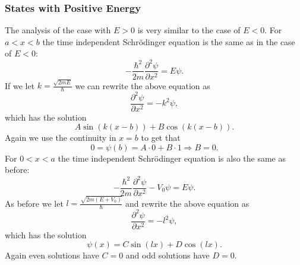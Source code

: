 \documentclass[12pt,a4paper]{article}
\newcommand{\pdiffn}[3]{\frac{\partial^{#3} #1}{\partial #2^{#3}}}
\begin{document}
\subsubsection{States with Positive Energy}
The analysis of the case with $E > 0$ is very similar to the case of $E < 0$. For $a < x < b$ the time independent Schrödinger equation is the same as in the case of $E < 0$:
\begin{equation}
- \frac{\hbar^2}{2 m} \pdiffn{\psi}{x}{2} = E \psi.
\end{equation}
If we let $k = \frac{\sqrt{2 m E}}{\hbar}$ we can rewrite the above equation as
\begin{equation}
\pdiffn{\psi}{x}{2} = - k^2 \psi,
\end{equation}
which has the solution
\begin{equation}
A \sin \left(k (x - b) \right) + B \cos \left(k (x - b) \right).
\end{equation}
Again we use the continuity in $x = b$ to get that
\begin{equation}
0 = \psi(b) = A \cdot 0 + B \cdot 1 \Rightarrow B = 0.
\end{equation}
For $0 < x < a$ the time independent Schrödinger equation is also the same as before:
\begin{equation}
- \frac{\hbar^2}{2 m} \pdiffn{\psi}{x}{2} - V_0 \psi = E \psi.
\end{equation}
As before we let $l = \frac{\sqrt{2 m (E + V_0)}}{\hbar}$ and rewrite the above equation as
\begin{equation}
\pdiffn{\psi}{x}{2} = -l^2 \psi,
\end{equation}
which has the solution
\begin{equation}
\psi(x) = C \sin(l x) + D \cos(l x).
\end{equation}
Again even solutions have $C = 0$ and odd solutions have $D = 0$.
\end{document}
